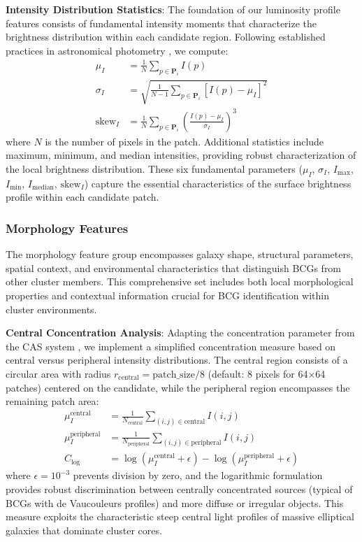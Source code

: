 \documentclass[twocolumn,10pt]{aastex631}
\begin{document}
\textbf{Intensity Distribution Statistics}: The foundation of our luminosity profile features consists of fundamental intensity moments that characterize the brightness distribution within each candidate region. Following established practices in astronomical photometry \citep{Bertin1996}, we compute:
\begin{align}
\mu_I &= \frac{1}{N} \sum_{p \in \mathbf{P}_i} I(p) \\
\sigma_I &= \sqrt{\frac{1}{N-1} \sum_{p \in \mathbf{P}_i} [I(p) - \mu_I]^2} \\
\text{skew}_I &= \frac{1}{N} \sum_{p \in \mathbf{P}_i} \left(\frac{I(p) - \mu_I}{\sigma_I}\right)^3
\end{align}
where $N$ is the number of pixels in the patch. Additional statistics include maximum, minimum, and median intensities, providing robust characterization of the local brightness distribution. These six fundamental parameters ($\mu_I$, $\sigma_I$, $I_{\max}$, $I_{\min}$, $I_{\text{median}}$, $\text{skew}_I$) capture the essential characteristics of the surface brightness profile within each candidate patch.

\subsubsection{Morphology Features}

The morphology feature group encompasses galaxy shape, structural parameters, spatial context, and environmental characteristics that distinguish BCGs from other cluster members. This comprehensive set includes both local morphological properties and contextual information crucial for BCG identification within cluster environments.

\textbf{Central Concentration Analysis}: Adapting the concentration parameter from the CAS system \citep{Conselice2003}, we implement a simplified concentration measure based on central versus peripheral intensity distributions. The central region consists of a circular area with radius $r_{\text{central}} = \text{patch\_size}/8$ (default: 8 pixels for 64×64 patches) centered on the candidate, while the peripheral region encompasses the remaining patch area:
\begin{align}
\mu_I^{\text{central}} &= \frac{1}{N_{\text{central}}} \sum_{(i,j) \in \text{central}} I(i,j) \\
\mu_I^{\text{peripheral}} &= \frac{1}{N_{\text{peripheral}}} \sum_{(i,j) \in \text{peripheral}} I(i,j) \\
C_{\text{log}} &= \log(\mu_I^{\text{central}} + \epsilon) - \log(\mu_I^{\text{peripheral}} + \epsilon)
\end{align}
where $\epsilon = 10^{-3}$ prevents division by zero, and the logarithmic formulation provides robust discrimination between centrally concentrated sources (typical of BCGs with de Vaucouleurs profiles) and more diffuse or irregular objects. This measure exploits the characteristic steep central light profiles of massive elliptical galaxies that dominate cluster cores.
\end{document}
